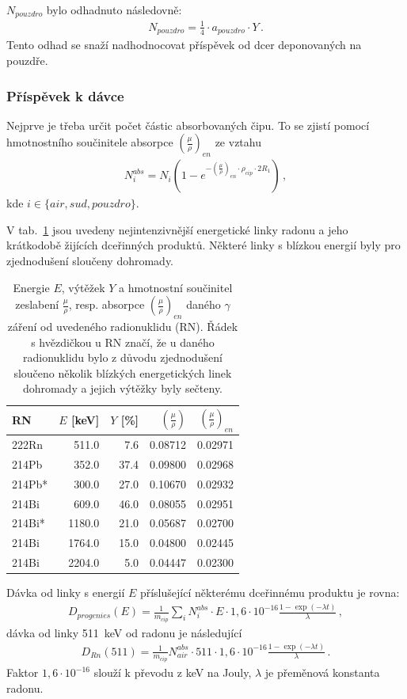 \documentclass[11pt,a4paper]{article}
\begin{document}
 $N_{pouzdro}$ bylo odhadnuto následovně:
\begin{align}
N_{pouzdro}=\frac{1}{4}\cdot a_{pouzdro}\cdot Y\,.
\end{align}
Tento odhad se snaží nadhodnocovat příspěvek od dcer deponovaných na pouzdře.

\subsubsection{Příspěvek k dávce}
Nejprve je třeba určit počet částic absorbovaných čipu. To se zjistí pomocí hmotnostního součinitele absorpce $\left(\frac{\mu}{\rho}\right)_{en}$ ze vztahu
\begin{align}
N_{i}^{abs}=N_i\left(1-e^{-\left(\frac{\mu}{\rho}\right)_{en}\cdot \rho_{cip}\cdot 2R_1}\right)\,,
\end{align}
kde $i\in\{air, sud, pouzdro\}$.

V tab.~\ref{tab:gamy} jsou uvedeny nejintenzivnější energetické linky radonu a jeho krátkodobě žijících dceřinných produktů. Některé linky s  blízkou energií byly pro zjednodušení sloučeny dohromady. 
\begin{table}[ht]
	\centering
	\caption{Energie $E$, výtěžek $Y$ a hmotnostní součinitel zeslabení $\frac{\mu}{\rho}$, resp. absorpce $\left(\frac{\mu}{\rho}\right)_{en}$ daného $\gamma$ záření od uvedeného radionuklidu (RN). Řádek s hvězdičkou u RN značí, že u daného radionuklidu bylo z důvodu zjednodušení sloučeno několik blízkých energetických linek dohromady a jejich výtěžky byly sečteny.}
	\label{tab:gamy}
	\begin{tabular}{lrrrr}
		\toprule	 
		RN &  $E$ [keV] &  $Y$ [\%] &       $\left(\frac{\mu}{\rho}\right)$ &    $\left(\frac{\mu}{\rho}\right)_{en}$ \\
		\midrule
		222Rn  &   511.0 &  7.6 &  0.08712 &  0.02971 \\
		214Pb  &   352.0 &  37.4 &  0.09800 &  0.02968 \\
		214Pb* &   300.0 &  27.0 &  0.10670 &  0.02932 \\
		214Bi  &   609.0 &  46.0 &  0.08055 &  0.02951 \\
		214Bi* &  1180.0 &  21.0 &  0.05687 &  0.02700 \\
		214Bi  &  1764.0 &  15.0 &  0.04800 &  0.02445 \\
		214Bi  &  2204.0 &  5.0 &  0.04447 &  0.02300 \\
		\bottomrule
	\end{tabular}
\end{table}
Dávka od linky s energií $E$ příslušející některému dceřinnému produktu je rovna:
\begin{align}
	D_{progenies}(E)=\frac{1}{m_{cip}}\sum_i N_{i}^{abs}\cdot E\cdot 1,6\cdot 10^{-16}\frac{1-\exp(-\lambda t)}{\lambda}\,,
\end{align}
dávka od linky \SI{511}{keV} od radonu je následující
\begin{align}
D_{Rn}(511)=\frac{1}{m_{cip}}N_{air}^{abs}\cdot 511\cdot 1,6\cdot 10^{-16}\frac{1-\exp(-\lambda t)}{\lambda}\,.
\end{align}
Faktor $1,6\cdot 10^{-16}$ slouží k převodu z \si{keV} na Jouly, $\lambda$ je přeměnová konstanta radonu.
\end{document}
